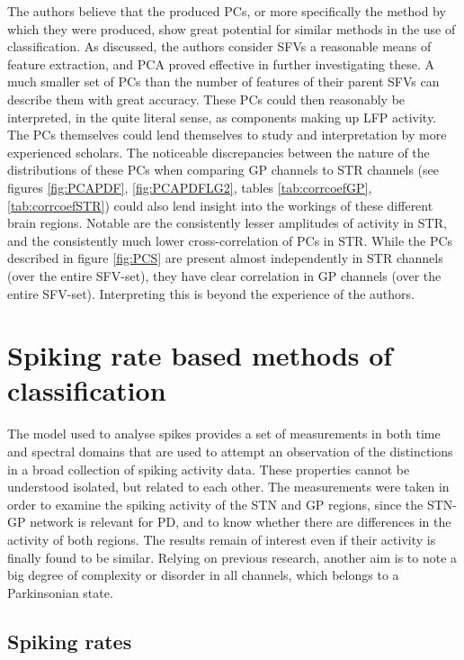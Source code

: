 \documentclass{kththesis}
\begin{document}
The authors believe that the produced PCs, or more specifically the method by which they were produced, show great potential for similar methods in the use of classification.
As discussed, the authors consider SFVs a reasonable means of feature extraction, and PCA proved effective in further investigating these.
A much smaller set of PCs than the number of features of their parent SFVs can describe them with great accuracy.
These PCs could then reasonably be interpreted, in the quite literal sense, as components making up LFP activity.
The PCs themselves could lend themselves to study and interpretation by more experienced scholars.
The noticeable discrepancies between the nature of the distributions of these PCs when comparing GP channels to STR channels (see figures \ref{fig:PCAPDF}, \ref{fig:PCAPDFLG2}, tables \ref{tab:corrcoefGP}, \ref{tab:corrcoefSTR}) could also lend insight into the workings of these different brain regions.
Notable are the consistently lesser amplitudes of activity in STR, and the consistently much lower cross-correlation of PCs in STR.
While the PCs described in figure \ref{fig:PCS} are present almost independently in STR channels (over the entire SFV-set), they have clear correlation in GP channels (over the entire SFV-set).
Interpreting this is beyond the experience of the authors.

\section{Spiking rate based methods of classification}

The model used to analyse spikes provides a set of measurements in both time and spectral domains that are used to attempt an observation of the distinctions in a broad collection of spiking activity data. These properties cannot be understood isolated, but related to each other. The measurements were taken in order to examine the spiking activity of the STN and GP regions, since the STN-GP network is relevant for PD, and to know whether there are differences in the activity of both regions. The results remain of interest even if their activity is finally found to be similar. Relying on previous research, another aim is to note a big degree of complexity or disorder in all channels, which belongs to a Parkinsonian state.

\subsection{Spiking rates}
\end{document}
